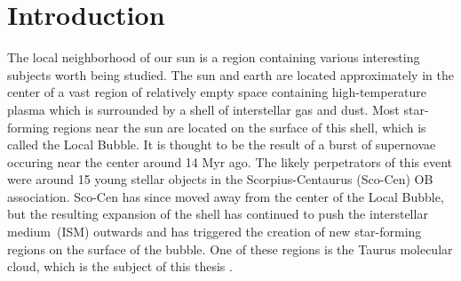 \chapter{Introduction}
The local neighborhood of our sun is a region containing various interesting subjects worth being studied.
The sun and earth are located approximately in the center of a vast region of relatively empty space containing
high-temperature plasma which is surrounded by a shell of interstellar gas and dust. Most star-forming regions
near the sun are located on the surface of this shell, which is called the Local Bubble. It is thought to
be the result of a burst of supernovae occuring near the center around 14 Myr ago. The likely perpetrators of this
event were around 15 young stellar objects in the Scorpius-Centaurus (Sco-Cen) OB association. Sco-Cen has since moved away
from the center of the Local Bubble, but the resulting expansion of the shell has continued to push the interstellar
medium~(ISM) outwards and has triggered the creation of new star-forming regions on the surface of the bubble.
One of these regions is the Taurus molecular cloud, which is the subject of this thesis \cite{Zucker2022}.